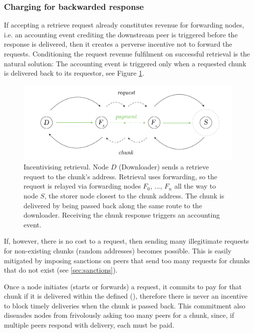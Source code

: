 \subsubsection{Charging for backwarded response}

If accepting a retrieve request already constitutes revenue for forwarding nodes, i.e. an accounting event crediting the downstream peer is triggered before the response is delivered, then it creates a perverse incentive not to forward the requests. Conditioning the request revenue fulfilment on successful retrieval is the natural solution: The accounting event is triggered only when a requested chunk is delivered back to its requestor, see Figure \ref{fig:retrieval-payment}.


\begin{figure}[htbp]
   \centering
   \includegraphics[width=\textwidth]{fig/retrieval-payment.pdf}
   \caption[Incentivising retrieval \statusgreen]{Incentivising retrieval. Node $D$ (Downloader) sends a retrieve request to the chunk's address. Retrieval uses forwarding, so the request is relayed via forwarding nodes $F_0$, ..., $F_n$ all the way to node $S$, the storer node closest to the chunk address. The chunk is delivered by being passed back along the same route to the downloader. Receiving the chunk response triggers an accounting event.}
   \label{fig:retrieval-payment}
\end{figure}

If, however, there is no cost to a request, then sending many illegitimate requests for non-existing chunks (random addresses) becomes possible. This is easily mitigated by imposing sanctions on peers that send too many requests for chunks that do not exist (see \ref{sec:sanctions}).

Once a node initiates (starts or forwards) a request, it commits to pay for that chunk if it is delivered within the defined  (), therefore there is never an incentive to block timely deliveries when the chunk is passed back.  This commitment also dissuades nodes from frivolously asking too many peers for a chunk, since, if multiple peers respond with delivery, each must be paid.


